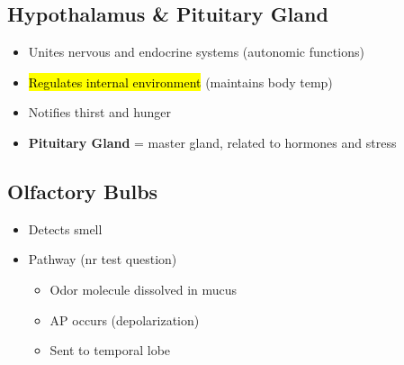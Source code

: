 \documentclass[a4paper,12pt]{article}
\begin{document}
\subsection{Hypothalamus \& Pituitary Gland}
\begin{itemize}
    \item{Unites nervous and endocrine systems (autonomic functions)}
    \item{\hl{Regulates internal environment} (maintains body temp)}
    \item{Notifies thirst and hunger}
    \item{\textbf{Pituitary Gland} = master gland, related to hormones and stress}
\end{itemize}

\subsection{Olfactory Bulbs}
\begin{itemize}
    \item{Detects smell}
    \item{
            Pathway (nr test question)
            \begin{itemize}
                \item{Odor molecule dissolved in mucus}
                \item{AP occurs (depolarization)}
                \item{Sent to temporal lobe}
            \end{itemize}
        }
\end{itemize}
\end{document}
